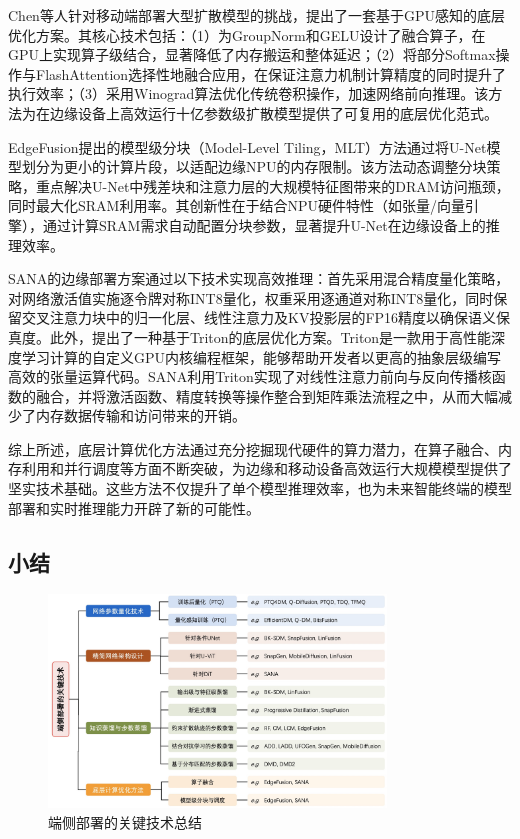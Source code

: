 \documentclass[11pt,a4paper,UTF8]{ctexart}
\begin{document}
Chen等人\cite{chen2023speed}针对移动端部署大型扩散模型的挑战，提出了一套基于GPU感知的底层优化方案。其核心技术包括：（1）为GroupNorm和GELU设计了融合算子，在GPU上实现算子级结合，显著降低了内存搬运和整体延迟；（2）将部分Softmax操作与FlashAttention\cite{dao2022flashattention}选择性地融合应用，在保证注意力机制计算精度的同时提升了执行效率；（3）采用Winograd算法优化传统卷积操作，加速网络前向推理。该方法为在边缘设备上高效运行十亿参数级扩散模型提供了可复用的底层优化范式。

EdgeFusion\cite{castells2024edgefusion}提出的模型级分块（Model-Level Tiling，MLT）方法通过将U-Net模型划分为更小的计算片段，以适配边缘NPU的内存限制。该方法动态调整分块策略，重点解决U-Net中残差块和注意力层的大规模特征图带来的DRAM访问瓶颈，同时最大化SRAM利用率。其创新性在于结合NPU硬件特性（如张量/向量引擎），通过计算SRAM需求自动配置分块参数，显著提升U-Net在边缘设备上的推理效率。

SANA\cite{xie2024sana}的边缘部署方案通过以下技术实现高效推理：首先采用混合精度量化策略，对网络激活值实施逐令牌对称INT8量化，权重采用逐通道对称INT8量化，同时保留交叉注意力块中的归一化层、线性注意力及KV投影层的FP16精度以确保语义保真度。此外，提出了一种基于Triton\cite{tillet2019triton}的底层优化方案。Triton是一款用于高性能深度学习计算的自定义GPU内核编程框架，能够帮助开发者以更高的抽象层级编写高效的张量运算代码。SANA利用Triton实现了对线性注意力前向与反向传播核函数的融合，并将激活函数、精度转换等操作整合到矩阵乘法流程之中，从而大幅减少了内存数据传输和访问带来的开销。

综上所述，底层计算优化方法通过充分挖掘现代硬件的算力潜力，在算子融合、内存利用和并行调度等方面不断突破，为边缘和移动设备高效运行大规模模型提供了坚实技术基础。这些方法不仅提升了单个模型推理效率，也为未来智能终端的模型部署和实时推理能力开辟了新的可能性。

\subsection{小结}

\begin{figure}[tbp]
\centering
\includegraphics[width=0.8\textwidth]{img/on-device-acc-tech.jpg}
\caption{端侧部署的关键技术总结}
\label{fig:on-device-acc-tech}
\end{figure}
\end{document}
